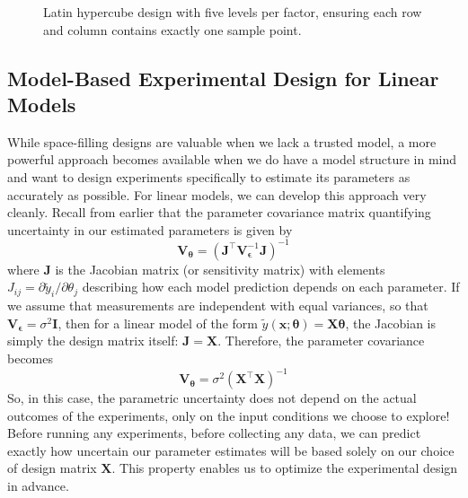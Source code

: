 \begin{figure}[H]
    \centering
    \caption{Latin hypercube design with five levels per factor, ensuring each row and column contains exactly one sample point.}
    \label{fig:latinhypercube}
\end{figure}

\subsection{Model-Based Experimental Design for Linear Models}

While space-filling designs are valuable when we lack a trusted model, a more powerful approach becomes available when we do have a model structure in mind and want to design experiments specifically to estimate its parameters as accurately as possible. For linear models, we can develop this approach very cleanly. Recall from earlier that the parameter covariance matrix quantifying uncertainty in our estimated parameters is given by
\begin{equation}
    \mathbf{V}_{\boldsymbol{\theta}} = \left(\mathbf{J}^\top \mathbf{V}_{\boldsymbol{\epsilon}}^{-1} \mathbf{J}\right)^{-1}
\end{equation}
where $\mathbf{J}$ is the Jacobian matrix (or sensitivity matrix) with elements $J_{ij} = \partial \tilde{y}_i / \partial \theta_j$ describing how each model prediction depends on each parameter. If we assume that measurements are independent with equal variances, so that $\mathbf{V}_{\boldsymbol{\epsilon}} = \sigma^2 \mathbf{I}$, then for a linear model of the form $\tilde{y}(\mathbf{x}; \boldsymbol{\theta}) = \mathbf{X}\boldsymbol{\theta}$, the Jacobian is simply the design matrix itself: $\mathbf{J} = \mathbf{X}$. Therefore, the parameter covariance becomes
\begin{equation}
    \mathbf{V}_{\boldsymbol{\theta}} = \sigma^2 \left(\mathbf{X}^\top \mathbf{X}\right)^{-1}
    \label{eq:param-cov-design}
\end{equation}
So, in this case, the parametric uncertainty does not depend on the actual outcomes of the experiments, only on the input conditions we choose to explore! Before running any experiments, before collecting any data, we can predict exactly how uncertain our parameter estimates will be based solely on our choice of design matrix $\mathbf{X}$. This property enables us to optimize the experimental design in advance.

